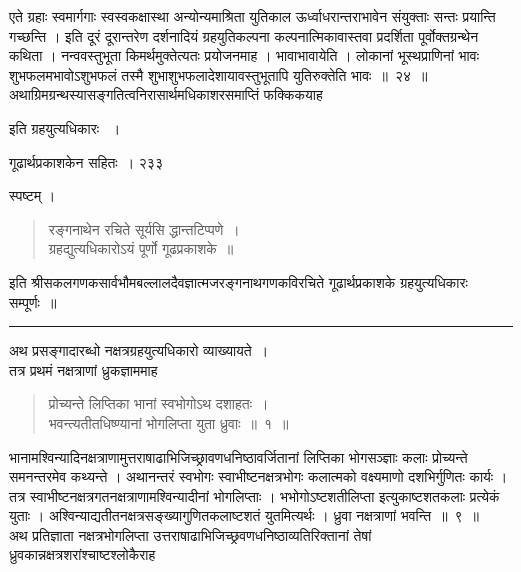 \documentclass[11pt, openany]{book}
\begin{document}
 एते ग्रहाः स्वमार्गगाः स्वस्वकक्षास्था अन्योन्यमाश्रिता युतिकाल ऊर्ध्वाधरान्तराभावेन संयुक्ताः सन्तः प्रयान्ति गच्छन्ति । इति दूरं दूरान्तरेण दर्शनादियं ग्रहयुतिकल्पना कल्पनात्मिकावास्तवा प्रदर्शिता पूर्वोक्तग्रन्थेन कथिता । नन्ववस्तुभूता किमर्थमुक्तेत्यतः प्रयोजनमाह । भावाभावायेति । लोकानां भूस्थप्राणिनां भावः शुभफलमभावोऽशुभफलं तस्मै शुभाशुभफलादेशायावस्तुभूतापि युतिरुक्तेति भावः~॥~२४~॥\\
\noindent अथाग्रिमग्रन्थस्यासङ्गतित्वनिरासार्थमधिकाशरसमाप्तिं फक्किकयाह \textendash


\begin{center}
 इति ग्रहयुत्यधिकारः ~।
\end{center}

\newpage

\hspace{3cm} गूढार्थप्रकाशकेन सहितः~। \hfill २३३
\vspace{1cm}


\noindent स्पष्टम् ।

\begin{quote}
{\qt रङ्गनाथेन रचिते सूर्यसि द्धान्तटिप्पणे~।\\
ग्रहद्युत्यधिकारोऽयं पूर्णो गूढप्रकाशके~॥ }
\end{quote}
 इति श्रीसकलगणकसार्वभौमबल्लालदैवज्ञात्मजरङ्गनाथगणकविरचिते गूढार्थप्रकाशके ग्रहयुत्यधिकारः सम्पूर्णः~॥

\begin{center}
    \rule{7em}{.5pt}
\end{center}



 अथ प्रसङ्गादारब्धो नक्षत्रग्रहयुत्यधिकारो व्याख्यायते~।\\
\noindent तत्र प्रथमं नक्षत्राणां ध्रुकज्ञाममाह \textendash

 \begin{quote}
{\ssi  प्रोच्यन्ते लिप्तिका भानां स्वभोगोऽथ दशाहतः~।\\
 भवन्त्यतीतधिष्ण्यानां भोगलिप्ता युता ध्रुवाः~॥~१~॥}
\end{quote}

 भानामश्विन्यादिनक्षत्राणामुत्तराषाढाभिजिच्छ्रावणधनिष्ठावर्जितानां लिप्तिका भोगसञ्ज्ञाः कलाः प्रोच्यन्ते समनन्तरमेव कथ्यन्ते । अथानन्तरं स्वभोगः स्वाभीष्टनक्षत्रभोगः कलात्मको वक्ष्यमाणो दशभिर्गुणितः कार्यः । तत्र स्वाभीष्टनक्षत्रगतनक्षत्राणामश्विन्यादीनां भोगलिप्ताः । भभोगोऽष्टशतीलिप्ता इत्युकाष्टशतकलाः प्रत्येकं युताः । अश्विन्याद्यतीतनक्षत्रसङ्ख्यागुणितकलाष्टशतं युतमित्यर्थः । ध्रुवा नक्षत्राणां भवन्ति~॥~९~॥\\
 \noindent अथ प्रतिज्ञाता नक्षत्रभोगलिप्ता उत्तराषाढाभिजिच्छ्रवणधनिष्ठाव्यतिरिक्तानां तेषां ध्रुवकान्नक्षत्रशरांश्चाष्टश्लोकैराह\textendash
\end{document}
